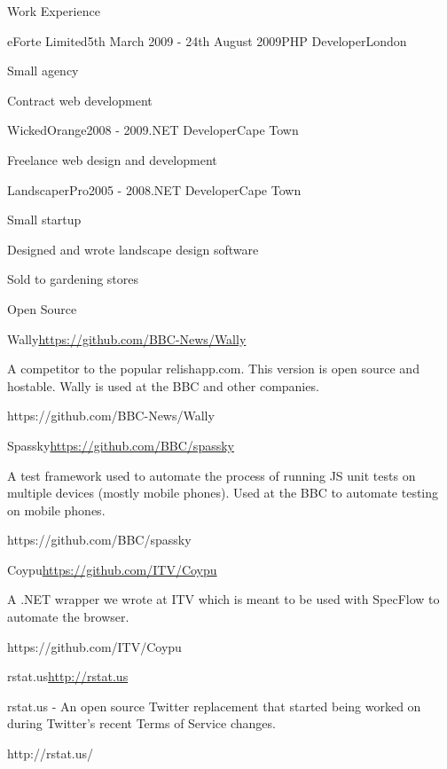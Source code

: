 \documentclass{resume}
\begin{document}
\begin{rSection}{Work Experience}
    \begin{rSubsection}{eForte Limited}{5th March 2009 - 24th August 2009}{PHP Developer}{London}
      \item Small agency
      \item Contract web development
    \end{rSubsection}

    \begin{rSubsection}{WickedOrange}{2008 - 2009}{.NET Developer}{Cape Town}
      \item Freelance web design and development
    \end{rSubsection}

    \begin{rSubsection}{LandscaperPro}{2005 - 2008}{.NET Developer}{Cape Town}
      \item Small startup
      \item Designed and wrote landscape design software
      \item Sold to gardening stores
    \end{rSubsection}
  \end{rSection}

  \begin{rSection}{Open Source}
    \begin{rSubsection}{Wally}{\url{https://github.com/BBC-News/Wally}}{}{}
      \item A competitor to the popular relishapp.com. This version is open source and hostable. Wally is used at the BBC and other companies.
      \item https://github.com/BBC-News/Wally
    \end{rSubsection}

    \begin{rSubsection}{Spassky}{\url{https://github.com/BBC/spassky}}{}{}
      \item A test framework used to automate the process of running JS unit tests on multiple devices (mostly mobile phones). Used at the BBC to automate testing on mobile phones.
      \item https://github.com/BBC/spassky
    \end{rSubsection}

    \begin{rSubsection}{Coypu}{\url{https://github.com/ITV/Coypu}}{}{}
      \item A .NET wrapper we wrote at ITV which is meant to be used with SpecFlow to automate the browser.
      \item https://github.com/ITV/Coypu
    \end{rSubsection}

    \begin{rSubsection}{rstat.us}{\url{http://rstat.us}}{}{}
      \item rstat.us - An open source Twitter replacement that started being worked on during Twitter’s recent Terms of Service changes.
      \item http://rstat.us/
    \end{rSubsection}
  \end{rSection}
\end{document}
